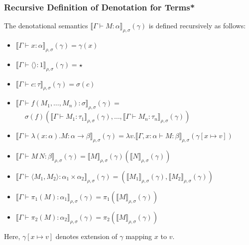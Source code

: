 \documentclass[aspectratio=169]{beamer}
\begin{document}
\begin{frame}
\frametitle{Recursive Definition of Denotation for Terms*}

The denotational semantics $\llbracket \Gamma \vdash M : \alpha \rrbracket_{\rho,\sigma} (\gamma)$ is defined recursively as follows:

\begin{itemize}
    \item $\llbracket \Gamma \vdash x : \alpha \rrbracket_{\rho,\sigma} (\gamma) = \gamma(x)$
    \item $\llbracket \Gamma \vdash \langle \rangle : 1 \rrbracket_{\rho,\sigma} (\gamma) = \star$
    \item $\llbracket \Gamma \vdash c : \tau \rrbracket_{\rho,\sigma} (\gamma) = \sigma(c)$
    \item $\llbracket \Gamma \vdash f(M_1, \ldots, M_n) : \sigma \rrbracket_{\rho,\sigma} (\gamma) =$ $\phantom{.}\quad\sigma(f)(\llbracket \Gamma \vdash M_1 : \tau_1 \rrbracket_{\rho,\sigma} (\gamma), \ldots, \llbracket \Gamma \vdash M_n : \tau_n \rrbracket_{\rho,\sigma} (\gamma))$
    \pause
    \item $\llbracket \Gamma \vdash \lambda (x : \alpha). M : \alpha \rightarrow \beta \rrbracket_{\rho,\sigma} (\gamma) = \lambda v. \llbracket \Gamma, x:\alpha \vdash M : \beta \rrbracket_{\rho,\sigma} (\gamma[x \mapsto v])$
    \pause
    \item $\llbracket \Gamma \vdash M \, N : \beta \rrbracket_{\rho,\sigma} (\gamma) = \llbracket M \rrbracket_{\rho,\sigma}(\gamma)(\llbracket N \rrbracket_{\rho,\sigma}(\gamma))$
    \item $\llbracket \Gamma \vdash \langle M_1, M_2 \rangle : \alpha_1 \times \alpha_2 \rrbracket_{\rho,\sigma} (\gamma) = (\llbracket M_1 \rrbracket_{\rho,\sigma}(\gamma), \llbracket M_2 \rrbracket_{\rho,\sigma}(\gamma))$
    \item $\llbracket \Gamma \vdash \pi_1(M) : \alpha_1 \rrbracket_{\rho,\sigma} (\gamma) = \pi_1(\llbracket M \rrbracket_{\rho,\sigma}(\gamma))$
    \item $\llbracket \Gamma \vdash \pi_2(M) : \alpha_2 \rrbracket_{\rho,\sigma} (\gamma) = \pi_2(\llbracket M \rrbracket_{\rho,\sigma}(\gamma))$
\end{itemize}

Here, $\gamma[x \mapsto v]$ denotes extension of $\gamma$ mapping $x$ to $v$.
\end{frame}
\end{document}
